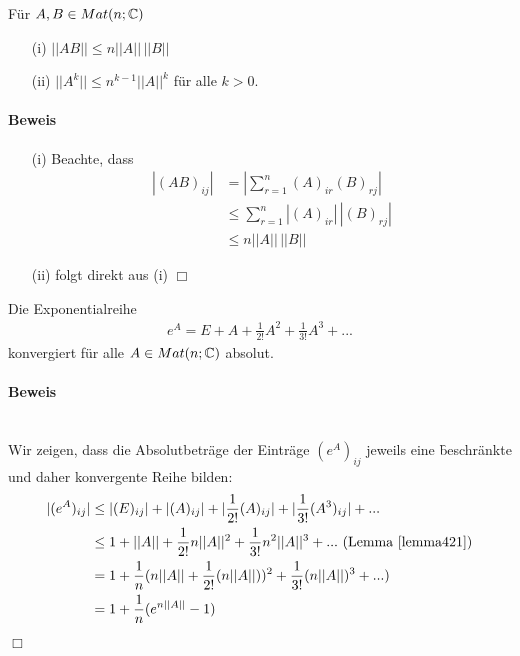 \begin{lemma} %
\label{lemma421}
Für $A, B \in Mat(n; \mathbb{C})$
\begin{itemize}
\item[(i)] $||AB|| \leq n ||A||\, ||B||$
\item[(ii)] $||A^k|| \leq n^{k-1} ||A||^{k} $ für alle $k > 0$.
\end{itemize}
\end{lemma}

\paragraph{Beweis}
\begin{itemize}
\item[(i)] Beachte, dass
\begin{align}
|(AB)_{ij}| &= |\sum_{r=1}^{n} (A)_{ir} (B)_{rj}| \\
&\leq \sum_{r=1}^{n} |(A)_{ir}|\, |(B)_{rj}| \\
&\leq n ||A||\, ||B||
\end{align}
\item[(ii)] folgt direkt aus (i) \hfill $\Box$
\end{itemize}

\begin{satz} %
\label{satz422}
Die Exponentialreihe
\begin{align}
e^A = E + A + \frac{1}{2!} A^2 + \frac{1}{3!} A^3 + ...
\end{align}
konvergiert für alle $A \in Mat(n; \mathbb{C})$ absolut.
\end{satz}

\paragraph{Beweis} {\ \\}
Wir zeigen, dass die Absolutbeträge der Einträge $(e^A)_{ij}$ jeweils eine \f{beschränkte} und daher konvergente Reihe bilden:
\begin{align}
|(e^A)_{ij}| &\leq |(E)_{ij}| + |(A)_{ij}| + |\frac{1}{2!}(A)_{ij}| + |\frac{1}{3!} (A^3)_{ij}| + ... \\
&\leq 1 + ||A|| + \frac{1}{2!} n ||A||^{2} + \frac{1}{3!} n^2 ||A||^3 + ... \text{ (Lemma \ref{lemma421})} \\
&= 1 + \frac{1}{n} (n ||A|| + \frac{1}{2!}(n ||A||))^2 + \frac{1}{3!}(n||A||)^3 + ... ) \\
&= 1 + \frac{1}{n} (e^{n ||A||} - 1)
\end{align}
\hspace*{1cm} \hfill $\Box$

